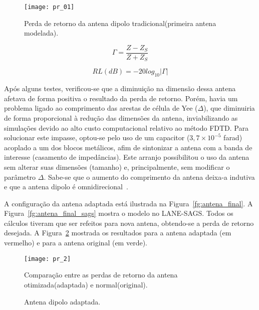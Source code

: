 \begin{figure}[!ht]
	\centering
	\texttt{[image: pr\_01]}
	\caption{Perda de retorno da antena dipolo tradicional(primeira antena modelada).}
	\label{fg:pr_01}
\end{figure}

\begin{equation}\label{eq:impedancia}
	\Gamma = \frac{Z - Z_{S}}{Z + Z_{S}}
\end{equation}

\begin{equation}\label{eq:pr}
	RL(dB) = -20log_{10} |\Gamma|
\end{equation}

	Após alguns testes, verificou-se que a diminuição na dimensão dessa antena afetava de forma positiva o resultado da perda de retorno. Porém, havia um problema ligado ao comprimento das arestas de célula de Yee ($\Delta$), que diminuiria de forma proporcional à redução das dimensões da antena, inviabilizando as simulações devido ao alto custo computacional relativo ao método FDTD. Para solucionar este impasse, optou-se pelo uso de um capacitor ($3,7\times10^{-5}$ farad) acoplado a um dos blocos metálicos, afim de sintonizar a antena com a banda de interesse (casamento de impedâncias). Este arranjo possibilitou o uso da antena sem alterar suas dimensões (tamanho) e, principalmente, sem modificar o parâmetro $\Delta$. Sabe-se que o aumento do comprimento da antena deixa-a indutiva e que a antena dipolo é omnidirecional~\cite{balanes}.

	A configuração da antena adaptada está ilustrada na Figura~\ref{fg:antena_final}. A Figura~\ref{fg:antena_final_sags} mostra o modelo no LANE-SAGS. Todos os cálculos tiveram que ser refeitos para nova antena, obtendo-se a perda de retorno desejada. A Figura~\ref{fg:pr_2} mostrada os resultados para a antena adaptada (em vermelho) e para a antena original (em verde). 

\begin{figure}[!ht]
	\centering
	\texttt{[image: pr\_2]}
	\caption{Comparação entre as perdas de retorno da antena otimizada(adaptada) e normal(original).}
	\label{fg:pr_2}
\end{figure}

\begin{figure}[!ht]
	\begin{center}
\qquad
	\end{center}
	\caption{Antena dipolo adaptada.}
	\label{fg:antena_aptada}
\end{figure}

